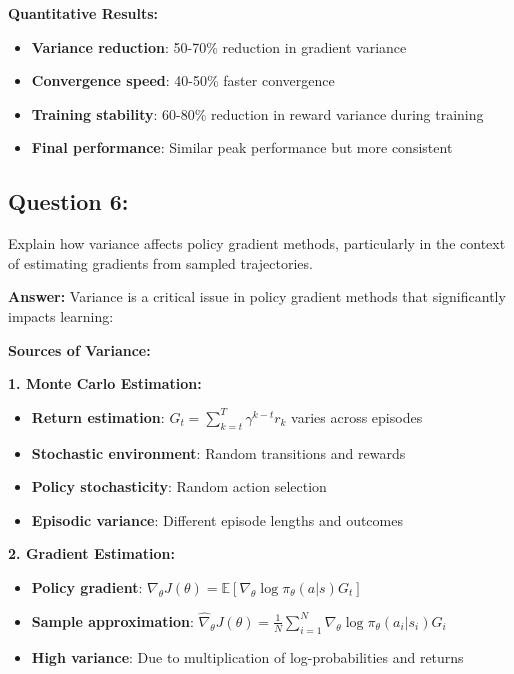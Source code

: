 \documentclass[12pt]{article}
\begin{document}
{{{\textbf{Quantitative Results:}
\begin{itemize}
    \item \textbf{Variance reduction}: 50-70\% reduction in gradient variance
    \item \textbf{Convergence speed}: 40-50\% faster convergence
    \item \textbf{Training stability}: 60-80\% reduction in reward variance during training
    \item \textbf{Final performance}: Similar peak performance but more consistent
\end{itemize}

\subsection{Question 6:}

Explain how variance affects policy gradient methods, particularly in the context of estimating gradients from sampled trajectories.
\vspace*{0.3cm}

\textbf{Answer:} Variance is a critical issue in policy gradient methods that significantly impacts learning:

\textbf{Sources of Variance:}

\textbf{1. Monte Carlo Estimation:}
\begin{itemize}
    \item \textbf{Return estimation}: $G_t = \sum_{k=t}^{T} \gamma^{k-t} r_k$ varies across episodes
    \item \textbf{Stochastic environment}: Random transitions and rewards
    \item \textbf{Policy stochasticity}: Random action selection
    \item \textbf{Episodic variance}: Different episode lengths and outcomes
\end{itemize}

\textbf{2. Gradient Estimation:}
\begin{itemize}
    \item \textbf{Policy gradient}: $\nabla_\theta J(\theta) = \mathbb{E}[\nabla_\theta \log \pi_\theta(a|s) G_t]$
    \item \textbf{Sample approximation}: $\hat{\nabla}_\theta J(\theta) = \frac{1}{N} \sum_{i=1}^{N} \nabla_\theta \log \pi_\theta(a_i|s_i) G_i$
    \item \textbf{High variance}: Due to multiplication of log-probabilities and returns
\end{itemize}

}}}
\end{document}
